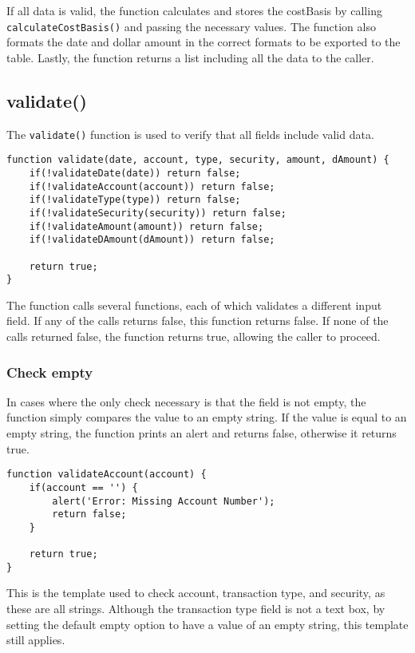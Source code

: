 \documentclass[letterpaper]{article}
\begin{document}
If all data is valid, the function calculates and stores the costBasis by calling \lstinline{calculateCostBasis()} and passing the necessary values.
The function also formats the date and dollar amount in the correct formats to be exported to the table.
Lastly, the function returns a list including all the data to the caller.

\subsection{validate()}

The \lstinline{validate()} function is used to verify that all fields include valid data.

\begin{lstlisting}[firstnumber=26]
function validate(date, account, type, security, amount, dAmount) {
    if(!validateDate(date)) return false;
    if(!validateAccount(account)) return false;
    if(!validateType(type)) return false;
    if(!validateSecurity(security)) return false;
    if(!validateAmount(amount)) return false;
    if(!validateDAmount(dAmount)) return false;

    return true;
}
\end{lstlisting}

The function calls several functions, each of which validates a different input field.
If any of the calls returns false, this function returns false.
If none of the calls returned false, the function returns true, allowing the caller to proceed.

\subsubsection{Check empty}

In cases where the only check necessary is that the field is not empty, the function simply compares the value to an empty string.
If the value is equal to an empty string, the function prints an alert and returns false, otherwise it returns true.

\begin{lstlisting}[firstnumber=54]
function validateAccount(account) {
    if(account == '') {
        alert('Error: Missing Account Number');
        return false;
    }

    return true;
}
\end{lstlisting}

This is the template used to check account, transaction type, and security, as these are all strings.
Although the transaction type field is not a text box, by setting the default empty option to have a value of an empty string, this template still applies.
\end{document}
